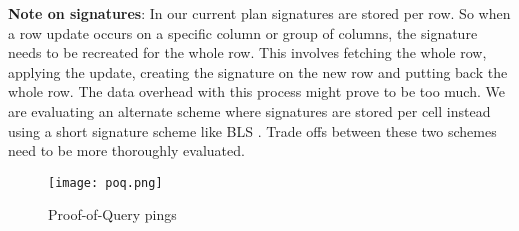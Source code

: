 \newline
\newline
\textbf{Note on signatures}: In our current plan signatures are stored per row. So when a row update occurs on a specific column or group of columns, the signature needs to be recreated for the whole row. This involves fetching the whole row, applying the update, creating the signature on the new row and putting back the whole row. The data overhead with this process might prove to be too much. We are evaluating an alternate scheme where signatures are stored per cell instead using a short signature scheme like BLS \cite{bls}. Trade offs between these two schemes need to be more thoroughly evaluated.
\begin{figure}[h!] \centering
	\texttt{[image: poq.png]}
	\caption{Proof-of-Query pings}
	\label{fig:poq}
\end{figure}
